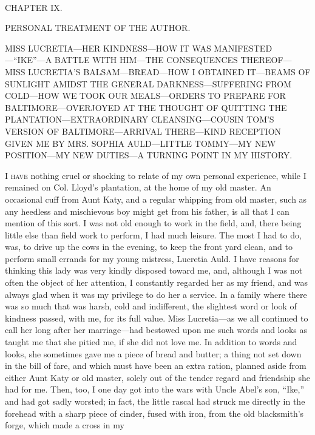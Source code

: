 {\protect\hypertarget{129}{}{}}

~

{CHAPTER IX.}

PERSONAL TREATMENT OF THE AUTHOR.

{MISS LUCRETIA---HER KINDNESS---HOW IT WAS MANIFESTED---``IKE''---A
BATTLE WITH HIM---THE CONSEQUENCES THEREOF---MISS LUCRETIA'S
BALSAM---BREAD---HOW I OBTAINED IT---BEAMS OF SUNLIGHT AMIDST THE
GENERAL DARKNESS---SUFFERING FROM COLD---HOW WE TOOK OUR MEALS---ORDERS
TO PREPARE FOR BALTIMORE---OVERJOYED AT THE THOUGHT OF QUITTING THE
PLANTATION---EXTRAORDINARY CLEANSING---COUSIN TOM'S VERSION OF
BALTIMORE---ARRIVAL THERE---KIND RECEPTION GIVEN ME BY MRS. SOPHIA
AULD---LITTLE TOMMY---MY NEW POSITION---MY NEW DUTIES---A TURNING POINT
IN MY HISTORY.}

\textsc{I have} nothing cruel or shocking to relate of my own personal
experience, while I remained on Col. Lloyd's plantation, at the home of
my old master. An occasional cuff from Aunt Katy, and a regular whipping
from old master, such as any heedless and mischievous boy might get from
his father, is all that I can mention of this sort. I was not old enough
to work in the field, and, there being little else than field work to
perform, I had much leisure. The most I had to do, was, to drive up the
cows in the evening, to keep the front yard clean, and to perform small
errands for my young mistress, Lucretia Auld. I have reasons for
thinking this lady was very kindly disposed toward me, and, although I
was not often the object of her attention, I constantly regarded her as
my friend, and was always glad when it was my privilege to do her a
service. In a family where there {\protect\hypertarget{130}{}{}}was so
much that was harsh, cold and indifferent, the slightest word or look of
kindness passed, with me, for its full value. Miss Lucretia---as we all
continued to call her long after her marriage---had bestowed upon me
such words and looks as taught me that she pitied me, if she did not
love me. In addition to words and looks, she sometimes gave me a piece
of bread and butter; a thing not set down in the bill of fare, and which
must have been an extra ration, planned aside from either Aunt Katy or
old master, solely out of the tender regard and friendship she had for
me. Then, too, I one day got into the wars with Uncle Abel's son,
``Ike,'' and had got sadly worsted; in fact, the little rascal had
struck me directly in the forehead with a sharp piece of cinder, fused
with iron, from the old blacksmith's forge, which made a cross in my
